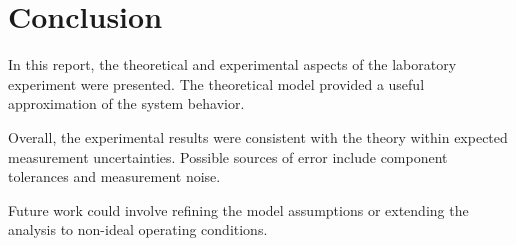 \section{Conclusion}
\label{sec:conclusion}

In this report, the theoretical and experimental aspects of the laboratory experiment
were presented. The theoretical model provided a useful approximation of the system
behavior.

Overall, the experimental results were consistent with the theory within expected
measurement uncertainties. Possible sources of error include component tolerances
and measurement noise.

Future work could involve refining the model assumptions or extending the analysis
to non-ideal operating conditions.